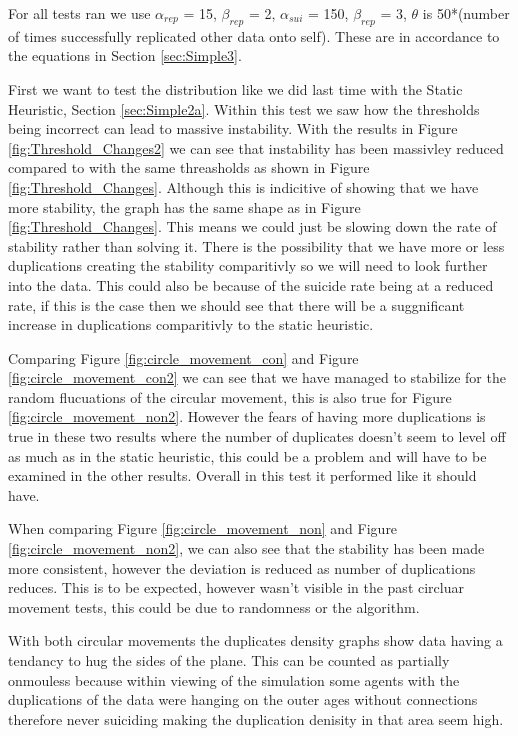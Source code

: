 \documentclass{UoYCSproject}
\begin{document}
For all tests ran we use $\alpha_{rep}$ = 15, $\beta_{rep}$ = 2, $\alpha_{sui}$ = 150, $\beta_{rep}$ = 3, $\theta$ is 50*(number of times successfully replicated other data onto self).
These are in accordance to the equations in Section \ref{sec:Simple3}.

First we want to test the distribution like we did last time with the Static Heuristic, Section \ref{sec:Simple2a}.
Within this test we saw how the thresholds being incorrect can lead to massive instability.
With the results in Figure \ref{fig:Threshold_Changes2} we can see that instability has been massivley reduced compared to with the same threasholds as shown in Figure \ref{fig:Threshold_Changes}.
Although this is indicitive of showing that we have more stability, the graph has the same shape as in Figure \ref{fig:Threshold_Changes}.
This means we could just be slowing down the rate of stability rather than solving it.
There is the possibility that we have more or less duplications creating the stability comparitivly so we will need to look further into the data.
This could also be because of the suicide rate being at a reduced rate, if this is the case then we should see that there will be a suggnificant increase in duplications comparitivly to the static heuristic.

Comparing Figure \ref{fig:circle_movement_con} and Figure \ref{fig:circle_movement_con2} we can see that we have managed to stabilize for the random flucuations of the circular movement, this is also true for Figure \ref{fig:circle_movement_non2}.
However the fears of having more duplications is true in these two results where the number of duplicates doesn't seem to level off as much as in the static heuristic, this could be a problem and will have to be examined in the other results.
Overall in this test it performed like it should have.

When comparing Figure \ref{fig:circle_movement_non} and Figure \ref{fig:circle_movement_non2}, we can also see that the stability has been made more consistent, however the deviation is reduced as number of duplications reduces.
This is to be expected, however wasn't visible in the past circluar movement tests, this could be due to randomness or the algorithm.

With both circular movements the duplicates density graphs show data having a tendancy to hug the sides of the plane.
This can be counted as partially onmouless because within viewing of the simulation some agents with the duplications of the data were hanging on the outer ages without connections therefore never suiciding making the duplication denisity in that area seem high.
\end{document}
